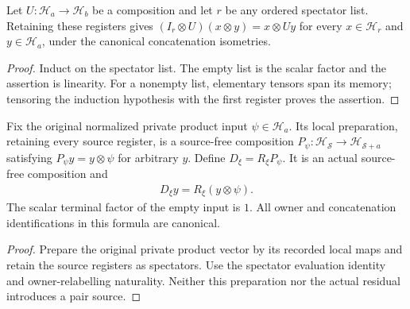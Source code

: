 \begin{theorem}
    \label{thm:peps_chrono_spectators}
    \leanok
    Let $U:\mathcal H_a\to\mathcal H_b$ be a composition and let $r$ be any
    ordered spectator list. Retaining these registers gives
    $(I_r\otimes U)(x\otimes y)=x\otimes Uy$ for every
    $x\in\mathcal H_r$ and $y\in\mathcal H_a$, under the canonical
    concatenation isometries.
\end{theorem}

\begin{proof}
    \leanok
    Induct on the spectator list. The empty list is the scalar factor and the
    assertion is linearity. For a nonempty list, elementary tensors span its
    memory; tensoring the induction hypothesis with the first register proves
    the assertion.
\end{proof}

\begin{definition}
    \label{def:peps_chrono_private_input}
    \leanok
    Fix the original normalized private product input $\psi\in\mathcal H_a$.
    Its local preparation, retaining every source register, is a source-free
    composition $P_\psi:\mathcal H_{\mathcal S}\to
        \mathcal H_{\mathcal S\mathbin{+}a}$ satisfying
    $P_\psi y=y\otimes\psi$ for arbitrary $y$.
    Define $D_\xi=R_\xi P_\psi$. It is an actual source-free composition and
    \begin{align}
        D_\xi y=R_\xi(y\otimes\psi).
        \label{eq:peps_chrono_private_input}
    \end{align}
    The scalar terminal factor of the empty input is $1$. All owner and
    concatenation identifications in this formula are canonical.
\end{definition}

\begin{proof}
    \leanok
    Prepare the original private product vector by its recorded local maps and
    retain the source registers as spectators. Use the spectator evaluation
    identity and owner-relabelling naturality. Neither this preparation nor the
    actual residual introduces a pair source.
\end{proof}

